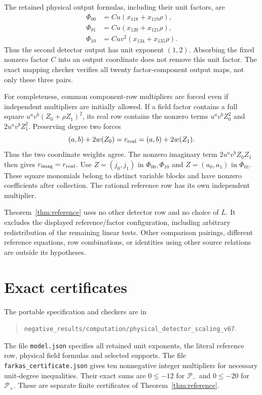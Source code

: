 \documentclass[11pt,a4paper]{article}
\begin{document}
The retained physical output formulas, including their unit factors,
are
\[
\begin{aligned}
\Phi_{00}&=Cu(x_{118}+x_{119}\rho),\\
\Phi_{01}&=Cu(x_{120}+x_{121}\rho),\\
\Phi_{10}&=Cuv^2(x_{134}+x_{135}\rho).
\end{aligned}
\]
Thus the second detector output has unit exponent $(1,2)$.
Absorbing the fixed nonzero factor $C$ into an output coordinate
does not remove this unit factor. The exact mapping checker verifies
all twenty factor-component output maps, not only these three pairs.

For completeness, common component-row multipliers are forced
even if independent multipliers are initially allowed. If a field
factor contains a full square $u^av^b(Z_0+\rho Z_1)^2$, its real
row contains the nonzero terms $u^av^bZ_0^2$ and
$2u^av^bZ_1^2$. Preserving degree two forces
\[
 (a,b)+2w(Z_0)=r_{\rm real}=(a,b)+2w(Z_1).
\]
Thus the two coordinate weights agree. The nonzero imaginary term
$2u^av^bZ_0Z_1$ then gives $r_{\rm imag}=r_{\rm real}$.
Use $Z=(j_0,j_1)$ in $\Phi_{00},\Phi_{10}$ and
$Z=(a_0,a_1)$ in $\Phi_{01}$. These square monomials belong to
distinct variable blocks and have nonzero coefficients after
collection. The rational reference row has its own independent
multiplier.

Theorem~\ref{thm:reference} uses no other detector row and no
choice of $L$. It excludes the displayed reference/factor
configuration, including arbitrary redistribution of the remaining
linear tests. Other comparison pairings, different reference
equations, row combinations, or identities using other source
relations are outside its hypotheses.

\section{Exact certificates}

The portable specification and checkers are in
\begin{quote}\raggedright
\nolinkurl{negative_results/computation/physical_detector_scaling_v67}.
\end{quote}
The file \texttt{model.json} specifies all retained unit exponents,
the literal reference row, physical field formulas and selected
supports. The file \texttt{farkas\_certificate.json} gives ten
nonnegative integer multipliers for necessary unit-degree
inequalities. Their exact sums are $0\le-12$ for $\mathcal P_-$
and $0\le-20$ for $\mathcal P_+$. These are separate finite
certificates of Theorem~\ref{thm:reference}.
\end{document}
